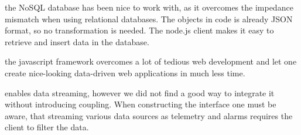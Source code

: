 \begin{description}[style=unboxed,leftmargin=0cm]
    \item[MongoDB] the NoSQL database has been nice to work with, as it overcomes the impedance mismatch when using relational databases. The objects in code is already JSON format, so no transformation is needed. The node.js client makes it easy to retrieve and insert data in the database.   
    \item[Angular] the javascript framework overcomes a lot of tedious web development and let one create nice-looking data-driven web applications in much less time.
    \item[SSE] enables data streaming, however we did not find a good way to integrate it without introducing coupling. When constructing the interface one must be aware, that streaming various data sources as telemetry and alarms requires the client to filter the data.
\end{description}